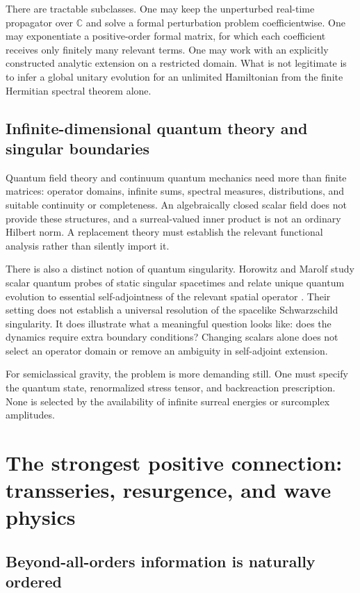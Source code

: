 \documentclass[11pt,letterpaper]{article}
\newcommand{\C}{\mathbb{C}}
\theoremstyle{definition}
\theoremstyle{remark}
\begin{document}
There are tractable subclasses. One may keep the unperturbed real-time
propagator over $\C$ and solve a formal perturbation problem coefficientwise.
One may exponentiate a positive-order formal matrix, for which each coefficient
receives only finitely many relevant terms. One may work with an explicitly
constructed analytic extension on a restricted domain. What is not legitimate
is to infer a global unitary evolution for an unlimited Hamiltonian from the
finite Hermitian spectral theorem alone.

\subsection{Infinite-dimensional quantum theory and singular boundaries}

Quantum field theory and continuum quantum mechanics need more than finite
matrices: operator domains, infinite sums, spectral measures, distributions,
and suitable continuity or completeness. An algebraically closed scalar field
does not provide these structures, and a surreal-valued inner product is not
an ordinary Hilbert norm. A replacement theory must establish the relevant
functional analysis rather than silently import it.

There is also a distinct notion of quantum singularity. Horowitz and Marolf
study scalar quantum probes of static singular spacetimes and relate unique
quantum evolution to essential self-adjointness of the relevant spatial
operator \cite{HorowitzMarolf}. Their setting does not establish a universal
resolution of the spacelike Schwarzschild singularity. It does illustrate
what a meaningful question looks like: does the dynamics require extra
boundary conditions? Changing scalars alone does not select an operator domain
or remove an ambiguity in self-adjoint extension.

For semiclassical gravity, the problem is more demanding still. One must
specify the quantum state, renormalized stress tensor, and backreaction
prescription. None is selected by the availability of infinite surreal
energies or surcomplex amplitudes.

\section{The strongest positive connection: transseries, resurgence, and wave physics}
\label{sec:resurgence}

\subsection{Beyond-all-orders information is naturally ordered}
\end{document}
